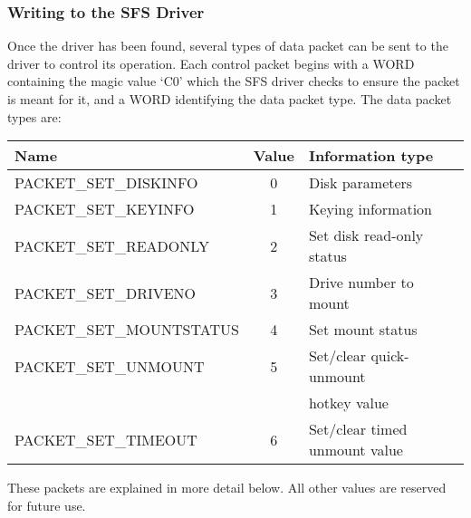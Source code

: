 \subsubsection{Writing to the SFS Driver}

Once the driver has been found, several types of data packet can be sent to the
driver to control its operation.  Each control packet begins with a WORD
containing the magic value `C0' which the SFS driver checks to ensure the
packet is meant for it, and a WORD identifying the data packet type.  The data
packet types are:

\begin{center}
\begin{tabular}{|l|c|l|}
\hline
    Name                   & Value   &    Information type\\
\hline
    PACKET\_SET\_DISKINFO    &   0     &    Disk parameters\\
    PACKET\_SET\_KEYINFO     &   1     &    Keying information\\
    PACKET\_SET\_READONLY    &   2     &    Set disk read-only status\\
    PACKET\_SET\_DRIVENO     &   3     &    Drive number to mount\\
    PACKET\_SET\_MOUNTSTATUS &   4     &    Set mount status\\
    PACKET\_SET\_UNMOUNT     &   5     &    Set/clear quick-unmount\\
                             &         &    hotkey value\\
    PACKET\_SET\_TIMEOUT     &   6     &    Set/clear timed unmount value\\
\hline
\end{tabular}
\end{center}

These packets are explained in more detail below.  All other values are
reserved for future use.

